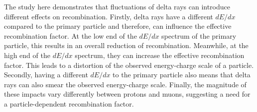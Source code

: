 The study here demonstrates that fluctuations of delta rays can introduce different effects on recombination.
Firstly, delta rays have a different $dE/dx$ compared to the primary particle and therefore, can influence the effective recombination factor.
At the low end of the $dE/dx$ spectrum of the primary particle, this results in an overall reduction of recombination.
Meanwhile, at the high end of the $dE/dx$ spectrum, they can increase the effective recombination factor.
This leads to a distortion of the observed energy-charge scale of a particle. 
Secondly, having a different $dE/dx$ to the primary particle also means that delta rays can also smear the observed energy-charge scale.
Finally, the magnitude of these impacts vary differently between protons and muons, suggesting a need for a particle-dependent recombination factor.   

